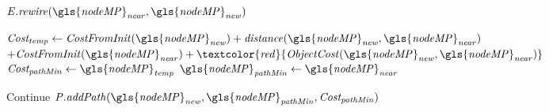 \begin{algorithm}[H]
\begin{algorithmic}[1]
      \State $\mathit{E.rewire(\gls{nodeMP}_{near}, \gls{nodeMP}_{new})}$
      \EndIf
      \Else {}

      \State $\mathit{Cost_{temp} \leftarrow CostFromInit(\gls{nodeMP}_{new}) + distance(\gls{nodeMP}_{new}, \gls{nodeMP}_{near})} $ \newline\hspace*{10em} $+ \mathit{CostFromInit(\gls{nodeMP}_{near}) + \textcolor{red}{ObjectCost(\gls{nodeMP}_{new}, \gls{nodeMP}_{near})}}$
      \State $\mathit{Cost_{pathMin} \leftarrow \gls{nodeMP}_{temp}}$
      \State $\mathit{\gls{nodeMP}_{pathMin} \leftarrow \gls{nodeMP}_{near}}$
      \EndIf
      \EndIf

      \State Continue
      \Else
      \State $\mathit{P.addPath(\gls{nodeMP}_{new}, \gls{nodeMP}_{pathMin}, Cost_{pathMin})}$
      \EndIf

      \EndFor

    \EndWhile
  \end{algorithmic}
\end{algorithm}
